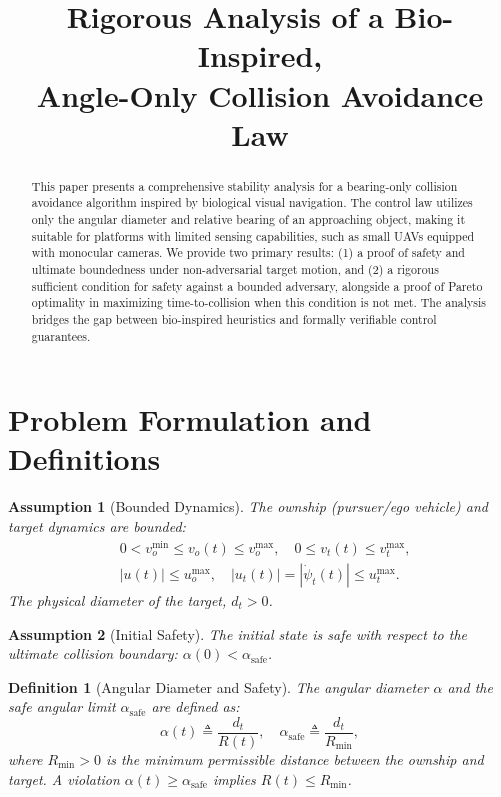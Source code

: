 \documentclass[10pt]{article}
\title{Rigorous Analysis of a Bio-Inspired, \\ Angle-Only Collision Avoidance Law}
\author{}
\date{}
\theoremstyle{plain}
\newtheorem{assumption}{Assumption}
\newtheorem{definition}{Definition}
\begin{document}
\maketitle

\begin{abstract}
This paper presents a comprehensive stability analysis for a bearing-only collision avoidance algorithm inspired by biological visual navigation. The control law utilizes only the angular diameter and relative bearing of an approaching object, making it suitable for platforms with limited sensing capabilities, such as small UAVs equipped with monocular cameras. We provide two primary results: (1) a proof of safety and ultimate boundedness under non-adversarial target motion, and (2) a rigorous sufficient condition for safety against a bounded adversary, alongside a proof of Pareto optimality in maximizing time-to-collision when this condition is not met. The analysis bridges the gap between bio-inspired heuristics and formally verifiable control guarantees.
\end{abstract}

\section{Problem Formulation and Definitions}

\begin{assumption}[Bounded Dynamics]\label{assump:bounds}
    The ownship (pursuer/ego vehicle) and target dynamics are bounded:
    \begin{align*}
        &0 < v_o^{\min} \leq v_o(t) \leq v_o^{\max}, \quad
        0 \leq v_t(t) \leq v_t^{\max}, \\
        &|u(t)| \leq u_o^{\max}, \quad
        |u_t(t)| = |\dot{\psi}_t(t)| \leq u_t^{\max}.
    \end{align*}
    The physical diameter of the target, $d_t > 0$.
\end{assumption}

\begin{assumption}[Initial Safety]\label{assump:init}
    The initial state is safe with respect to the ultimate collision boundary: $\alpha(0) < \alpha_{\text{safe}}$.
\end{assumption}

\begin{definition}[Angular Diameter and Safety]\label{def:alpha}
    The angular diameter $\alpha$ and the safe angular limit $\alpha_{\text{safe}}$ are defined as:
    \[
    \alpha(t) \triangleq \frac{d_t}{R(t)}, \quad \alpha_{\text{safe}} \triangleq \frac{d_t}{R_{\text{min}}},
    \]
    where $R_{\text{min}} > 0$ is the minimum permissible distance between the ownship and target. A violation $\alpha(t) \geq \alpha_{\text{safe}}$ implies $R(t) \leq R_{\text{min}}$.
\end{definition}
\end{document}
